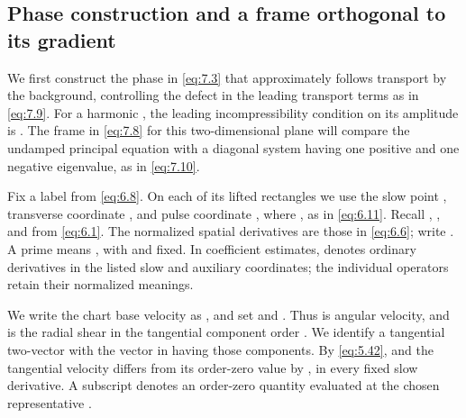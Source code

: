 \subsection{Phase construction and a frame orthogonal to its gradient}\label{sec:7.1}
We first construct the phase
 in \eqref{eq:7.3} that approximately follows transport by the background, controlling the defect in
the leading transport terms as in \eqref{eq:7.9}. For a harmonic , the leading incompressibility
condition on its amplitude  is . The frame  in \eqref{eq:7.8} for this two-dimensional
plane will compare the undamped principal equation with a diagonal system having one
positive and one negative eigenvalue, as in \eqref{eq:7.10}.

Fix a label  from \eqref{eq:6.8}. On each of its lifted rectangles we use the slow
point , transverse coordinate , and pulse coordinate , where
, as in \eqref{eq:6.11}. Recall , , and  from \eqref{eq:6.1}. The
normalized spatial derivatives are those in \eqref{eq:6.6}; write . A prime
means , with  and  fixed. In coefficient estimates,  denotes ordinary derivatives
in the listed slow and auxiliary coordinates; the individual operators  retain their
normalized meanings.

We write the chart base velocity as , and set  and .
Thus  is angular velocity, and  is the radial shear in the tangential component order .
We identify a tangential two-vector with the vector in  having those components.
By \eqref{eq:5.42},  and the tangential velocity differs from its order-zero value by , in
every fixed slow derivative. A subscript  denotes an order-zero quantity evaluated at the
chosen representative .

